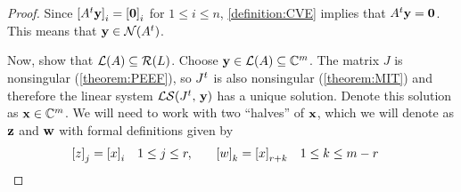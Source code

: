 \documentclass{ximera}
\begin{document}
\begin{theorem}
\begin{proof}
  Since
  $\left\lbrack A^{t}\mathbf{y}\right\rbrack_{i}=\left\lbrack\mathbf{0}\right\rbrack_{i}$
  for $1\leq i\leq n$, \ref{definition:CVE} implies that
  $A^{t}\mathbf{y}=\mathbf{0}$.  This means that
  $\mathbf{y}\in\mathcal{N}\!\left(A^{t}\right)$.

  Now, show that $\mathcal{L}\!\left(A\right)\subseteq\mathcal{R}\!\left(L\right)$.  Choose
  $\mathbf{y}\in\mathcal{L}\!\left(A\right)\subseteq\mathbb{C}^{m}$.  The matrix $J$ is
  nonsingular (\ref{theorem:PEEF}), so $J^{t}$ is also
  nonsingular (\ref{theorem:MIT}) and therefore the linear system
  $\mathcal{LS}\!\left(J^{t},\,\mathbf{y}\right)$ has a unique solution.
  Denote this solution as $\mathbf{x}\in\mathbb{C}^{m}$.  We will need to
  work with two ``halves'' of $\mathbf{x}$, which we will denote as
  $\mathbf{z}$ and $\mathbf{w}$ with formal definitions given by
  \begin{align*}
    \left\lbrack z\right\rbrack_{j}&=\left\lbrack x\right\rbrack_{i}
    &
    &1\leq j\leq r,
    &&&
        \left\lbrack w\right\rbrack_{k}&=\left\lbrack x\right\rbrack_{r+k}
    &
    &1\leq k\leq m-r
  \end{align*}


\end{proof}
\end{theorem}
\end{document}
